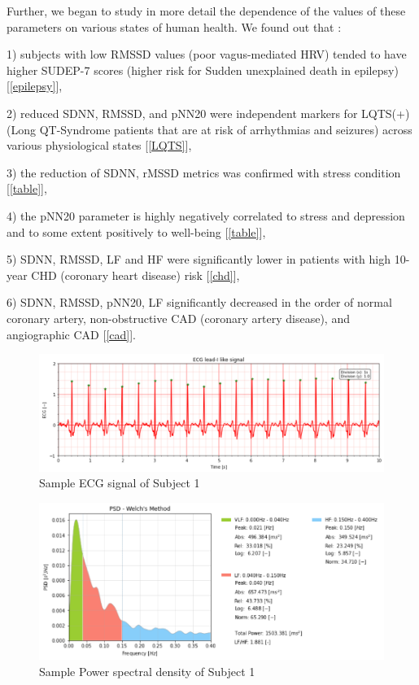 \documentclass[9pt,twocolumn,twoside,lineno]{gsajnl}
\begin{document}
Further, we began to study in more detail the dependence of the values of these parameters on various states of human health. We found out that : 

1) subjects with low RMSSD values (poor vagus-mediated HRV) tended to have higher SUDEP-7 scores (higher risk for Sudden unexplained death in epilepsy) [\ref{epilepsy}], 

2) reduced SDNN, RMSSD, and pNN20 were independent markers for LQTS(+) (Long QT-Syndrome patients that are at risk of arrhythmias and seizures) across various physiological states [\ref{LQTS}], 

3) the reduction of SDNN, rMSSD metrics was confirmed  with stress condition [\ref{table}],

4) the pNN20 parameter is highly negatively correlated to stress and depression and to some extent positively to well-being [\ref{table}], 

5) SDNN, RMSSD, LF and HF were significantly lower in patients with high 10-year CHD (coronary heart disease) risk [\ref{chd}], 

6) SDNN, RMSSD, pNN20, LF significantly decreased in the order of normal coronary artery, non-obstructive CAD (coronary artery disease), and angiographic CAD [\ref{cad}]. 


\begin{figure}[b] 

    \centering
    \includegraphics[scale=0.5]{ecg.png}
    \caption{\centering Sample ECG signal of Subject 1}
    
 \label{fig1}
\end{figure} 

\begin{figure}[b] 

    \centering
    \includegraphics[scale=0.56]{psd.png}
    \caption{\centering Sample Power spectral density of Subject 1}
    
 \label{fig2}
\end{figure} 
\end{document}
